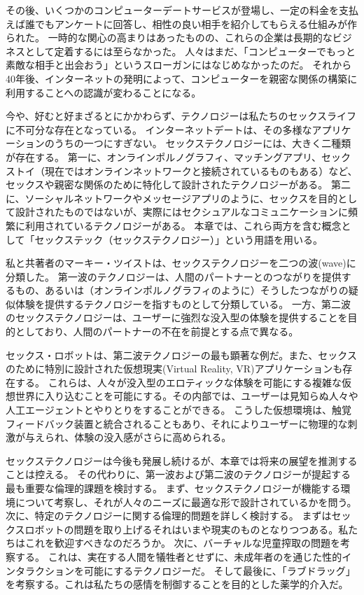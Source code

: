 \documentclass[paper=a4,book,openany]{jlreq} \usepackage{mystyle}
\begin{document}
その後、いくつかのコンピューターデートサービスが登場し、一定の料金を支払えば誰でもアンケートに回答し、相性の良い相手を紹介してもらえる仕組みが作られた。
一時的な関心の高まりはあったものの、これらの企業は長期的なビジネスとして定着するには至らなかった。
人々はまだ、「コンピューターでもっと素敵な相手と出会おう」というスローガンにはなじめなかったのだ。
それから40年後、インターネットの発明によって、コンピューターを親密な関係の構築に利用することへの認識が変わることになる。

今や、好むと好まざるとにかかわらず、テクノロジーは私たちのセックスライフに不可分な存在となっている。
インターネットデートは、その多様なアプリケーションのうちの一つにすぎない。
セックステクノロジーには、大きく二種類が存在する。
第一に、オンラインポルノグラフィ、マッチングアプリ、セックストイ（現在ではオンラインネットワークと接続されているものもある）など、セックスや親密な関係のために特化して設計されたテクノロジーがある。
第二に、ソーシャルネットワークやメッセージアプリのように、セックスを目的として設計されたものではないが、実際にはセクシュアルなコミュニケーションに頻繁に利用されているテクノロジーがある。
本章では、これら両方を含む概念として「セックステック（セックステクノロジー）」という用語を用いる。

私と共著者のマーキー・ツイストは、セックステクノロジーを二つの波(wave)に分類した\citep{mcarthur17:_rise_digis}。
第一波のテクノロジーは、人間のパートナーとのつながりを提供するもの、あるいは（オンラインポルノグラフィのように）そうしたつながりの疑似体験を提供するテクノロジーを指すものとして分類している。
一方、第二波のセックステクノロジーは、ユーザーに強烈な没入型の体験を提供することを目的としており、人間のパートナーの不在を前提とする点で異なる。

セックス・ロボットは、第二波テクノロジーの最も顕著な例だ。また、セックスのために特別に設計された仮想現実(Virtual Reality, VR)アプリケーションも存在する。
これらは、人々が没入型のエロティックな体験を可能にする複雑な仮想世界に入り込むことを可能にする。その内部では、ユーザーは見知らぬ人々や人工エージェントとやりとりをすることができる。
こうした仮想環境は、触覚フィードバック装置と統合されることもあり、それによりユーザーに物理的な刺激が与えられ、体験の没入感がさらに高められる。

セックステクノロジーは今後も発展し続けるが、本章では将来の展望を推測することは控える。
その代わりに、第一波および第二波のテクノロジーが提起する最も重要な倫理的課題を検討する。
まず、セックステクノロジーが機能する環境について考察し、それが人々のニーズに最適な形で設計されているかを問う。
次に、特定のテクノロジーに関する倫理的問題を詳しく検討する。
まずはセックスロボットの問題を取り上げる{\DDASH}それはいまや現実のものとなりつつある。私たちはこれを歓迎すべきなのだろうか。
次に、バーチャルな児童搾取の問題を考察する。
これは、実在する人間を犠牲者とせずに、未成年者のを通じた性的インタラクションを可能にするテクノロジーだ。
そして最後に、「ラブドラッグ」を考察する。これは私たちの感情を制御することを目的とした薬学的介入だ。
\end{document}
